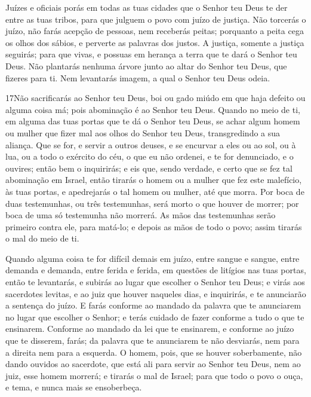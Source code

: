 Juízes e oficiais porás em todas as tuas cidades que o Senhor teu
Deus te der entre as tuas tribos, para que julguem o povo com juízo
de justiça. Não torcerás o juízo, não farás acepção de
pessoas, nem receberás peitas; porquanto a peita cega os olhos dos
sábios, e perverte as palavras dos justos. A justiça, somente
a justiça seguirás; para que vivas, e possuas em herança a terra que
te dará o Senhor teu Deus. Não plantarás nenhuma árvore junto
ao altar do Senhor teu Deus, que fizeres para ti. Nem
levantarás imagem, a qual o Senhor teu Deus odeia.

\medskip

\lettrine{17} Não sacrificarás ao Senhor teu Deus, boi ou gado
miúdo em que haja defeito ou alguma coisa má; pois abominação é ao
Senhor teu Deus. Quando no meio de ti, em alguma das tuas portas
que te dá o Senhor teu Deus, se achar algum homem ou mulher que
fizer mal aos olhos do Senhor teu Deus, transgredindo a sua aliança.
Que se for, e servir a outros deuses, e se encurvar a eles ou ao
sol, ou à lua, ou a todo o exército do céu, o que eu não ordenei,
e te for denunciado, e o ouvires; então bem o inquirirás; e eis
que, sendo verdade, e certo que se fez tal abominação em Israel,
então tirarás o homem ou a mulher que fez este malefício, às
tuas portas, e apedrejarás o tal homem ou mulher, até que morra.
Por boca de duas testemunhas, ou três testemunhas, será morto o
que houver de morrer; por boca de uma só testemunha não morrerá.
As mãos das testemunhas serão primeiro contra ele, para matá-lo;
e depois as mãos de todo o povo; assim tirarás o mal do meio de ti.

Quando alguma coisa te for difícil demais em juízo, entre sangue e
sangue, entre demanda e demanda, entre ferida e ferida, em questões
de litígios nas tuas portas, então te levantarás, e subirás ao lugar
que escolher o Senhor teu Deus; e virás aos sacerdotes levitas,
e ao juiz que houver naqueles dias, e inquirirás, e te anunciarão a
sentença do juízo. E farás conforme ao mandado da palavra que
te anunciarem no lugar que escolher o Senhor; e terás cuidado de
fazer conforme a tudo o que te ensinarem. Conforme ao mandado
da lei que te ensinarem, e conforme ao juízo que te disserem, farás;
da palavra que te anunciarem te não desviarás, nem para a direita
nem para a esquerda. O homem, pois, que se houver
soberbamente, não dando ouvidos ao sacerdote, que está ali para
servir ao Senhor teu Deus, nem ao juiz, esse homem morrerá; e
tirarás o mal de Israel; para que todo o povo o ouça, e tema,
e nunca mais se ensoberbeça.

